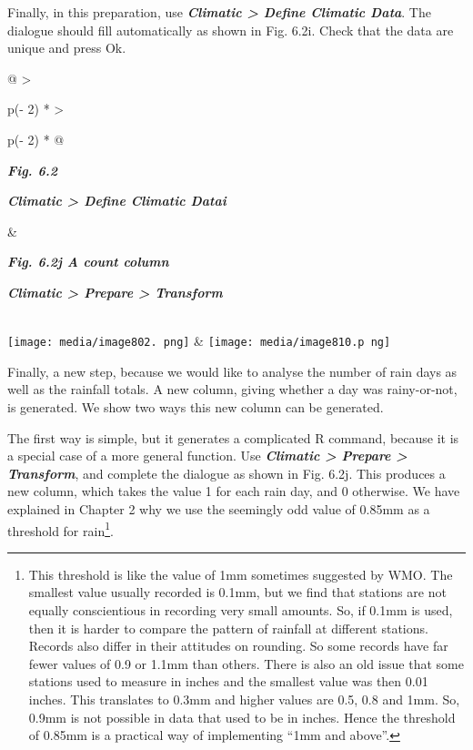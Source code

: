 \documentclass[
  letterpaper,
  DIV=11,
  numbers=noendperiod]{scrreprt}
\begin{document}
Finally, in this preparation, use \textbf{\emph{Climatic \textgreater{}
Define Climatic Data}}. The dialogue should fill automatically as shown
in Fig. 6.2i. Check that the data are unique and press Ok.

\begin{longtable}[]{@{}
  >{\raggedright\arraybackslash}p{(\columnwidth - 2\tabcolsep) * }
  >{\raggedright\arraybackslash}p{(\columnwidth - 2\tabcolsep) * }@{}}
\toprule\noalign{}
\begin{minipage}[b]{\linewidth}\raggedright
\textbf{\emph{Fig. 6.2}}

\textbf{\emph{Climatic \textgreater{} Define Climatic Datai}}
\end{minipage} & \begin{minipage}[b]{\linewidth}\raggedright
\textbf{\emph{Fig. 6.2j A count column}}

\textbf{\emph{Climatic \textgreater{} Prepare \textgreater{} Transform}}
\end{minipage} \\
\midrule\noalign{}
\endhead
\bottomrule\noalign{}
\endlastfoot
\texttt{[image: media/image802. png]}
&
\texttt{[image: media/image810.p ng]} \\
\end{longtable}

Finally, a new step, because we would like to analyse the number of rain
days as well as the rainfall totals. A new column, giving whether a day
was rainy-or-not, is generated. We show two ways this new column can be
generated.

The first way is simple, but it generates a complicated R command,
because it is a special case of a more general function. Use
\textbf{\emph{Climatic \textgreater{} Prepare \textgreater{}
Transform}}, and complete the dialogue as shown in Fig. 6.2j. This
produces a new column, which takes the value 1 for each rain day, and 0
otherwise. We have explained in Chapter 2 why we use the seemingly odd
value of 0.85mm as a threshold for rain\footnote{This threshold is like
  the value of 1mm sometimes suggested by WMO. The smallest value
  usually recorded is 0.1mm, but we find that stations are not equally
  conscientious in recording very small amounts. So, if 0.1mm is used,
  then it is harder to compare the pattern of rainfall at different
  stations. Records also differ in their attitudes on rounding. So some
  records have far fewer values of 0.9 or 1.1mm than others. There is
  also an old issue that some stations used to measure in inches and the
  smallest value was then 0.01 inches. This translates to 0.3mm and
  higher values are 0.5, 0.8 and 1mm. So, 0.9mm is not possible in data
  that used to be in inches. Hence the threshold of 0.85mm is a
  practical way of implementing ``1mm and above''.}.
\end{document}
